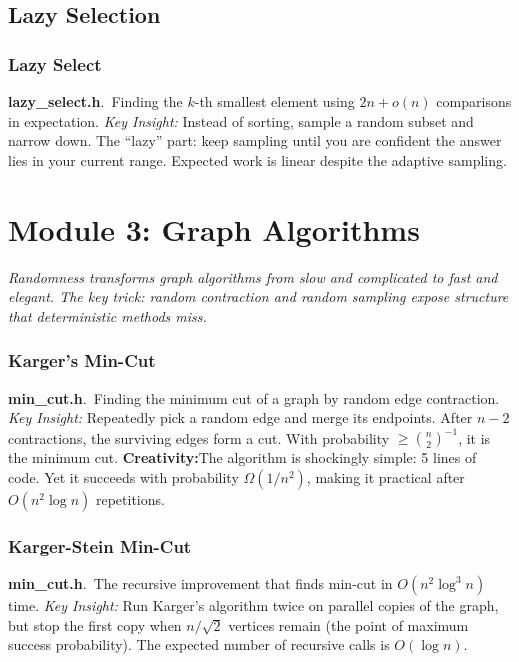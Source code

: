 \documentclass[11pt,a4paper]{article}
\newcommand{\algo}[2]{\textbf{#1}.\ #2}
\newcommand{\insight}{\textit{Key Insight: }}
\newcommand{\creative}{\textcolor{orange!80!black}{\textbf{Creativity:}}}
\begin{document}
\subsection{Lazy Selection}

\subsubsection{Lazy Select}
\algo{lazy\_select.h}{Finding the \(k\)-th smallest element using \(2n + o(n)\) comparisons in expectation.}
\insight Instead of sorting, sample a random subset and narrow down. The ``lazy'' part: keep sampling until you are confident the answer lies in your current range. Expected work is linear despite the adaptive sampling.

\section{Module 3: Graph Algorithms}
\label{sec:graphs}

\textit{Randomness transforms graph algorithms from slow and complicated to fast and elegant. The key trick: random contraction and random sampling expose structure that deterministic methods miss.}

\subsubsection{Karger's Min-Cut}
\algo{min\_cut.h}{Finding the minimum cut of a graph by random edge contraction.}
\insight Repeatedly pick a random edge and merge its endpoints. After \(n-2\) contractions, the surviving edges form a cut. With probability \(\ge \binom{n}{2}^{-1}\), it is the minimum cut.
\creative The algorithm is shockingly simple: 5 lines of code. Yet it succeeds with probability \(\Omega(1/n^2)\), making it practical after \(O(n^2 \log n)\) repetitions.

\subsubsection{Karger-Stein Min-Cut}
\algo{min\_cut.h}{The recursive improvement that finds min-cut in \(O(n^2 \log^3 n)\) time.}
\insight Run Karger's algorithm twice on parallel copies of the graph, but stop the first copy when \(n/\sqrt{2}\) vertices remain (the point of maximum success probability). The expected number of recursive calls is \(O(\log n)\).
\end{document}
